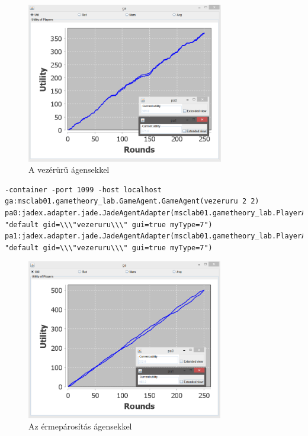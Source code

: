 		\begin{figure}[h]
		\begin{center}
		\includegraphics[height=7cm]{figures/uru_jadex.png}
		\caption{A vezérürü ágensekkel}
		\end{center}
		\end{figure}

\begin{lstlisting}[caption=Vezérürü run config, frame=single,float=!ht]
-container -port 1099 -host localhost 
ga:msclab01.gametheory_lab.GameAgent.GameAgent(vezeruru 2 2) 
pa0:jadex.adapter.jade.JadeAgentAdapter(msclab01.gametheory_lab.PlayerAgent.Player 
"default gid=\\\"vezeruru\\\" gui=true myType=7") 
pa1:jadex.adapter.jade.JadeAgentAdapter(msclab01.gametheory_lab.PlayerAgent.Player 
"default gid=\\\"vezeruru\\\" gui=true myType=7")
\end{lstlisting}
		

		\begin{figure}[h]
		\begin{center}
		\includegraphics[height=7cm]{figures/erme_jadex.png}
		\caption{Az érmepárosítás ágensekkel}
		\end{center}
		\end{figure}


